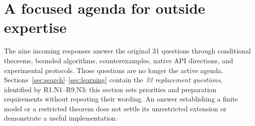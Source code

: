 \section{A focused agenda for outside expertise}\label{sec:experts}

The nine incoming responses answer the original 31 questions through
conditional theorems, bounded algorithms, counterexamples, native API
directions, and experimental protocols. Those questions are no longer the
active agenda. Sections~\ref{sec:search}--\ref{sec:learning} contain the
\emph{33 replacement questions}, identified by R1.N1--R9.N3; this section
sets priorities and preparation requirements without repeating their wording.
An answer establishing a finite model or a restricted theorem does not settle
its unrestricted extension or demonstrate a useful implementation.

